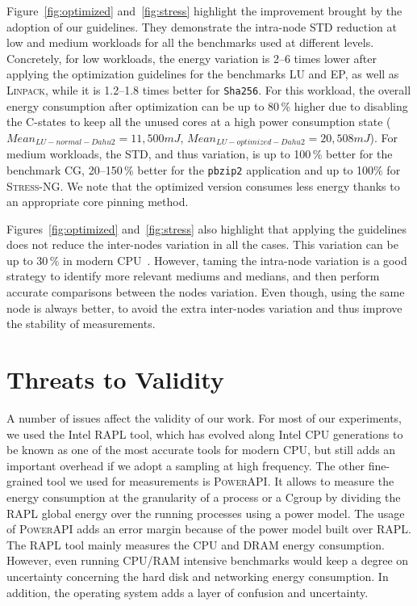 Figure~\ref{fig:optimized} and~\ref{fig:stress} highlight the improvement brought by the adoption of our guidelines.
They demonstrate the intra-node STD reduction at low and medium workloads for all the benchmarks used at different levels.
Concretely, for low workloads, the energy variation is 2--6 times lower after applying the optimization guidelines for the benchmarks \textsf{LU} and \textsf{EP}, as well as \textsc{Linpack}, while it is 1.2--1.8 times better for \texttt{Sha256}.
For this workload, the overall energy consumption after optimization can be up to 80\,\% higher due to disabling the C-states to keep all the unused cores at a high power consumption state ($Mean_{LU-normal-Dahu2}=11,500 mJ$, $Mean_{LU-optimized-Dahu2}=20,508 mJ$).
For medium workloads, the STD, and thus variation, is up to 100\,\% better for the benchmark \textsf{CG}, 20--150\,\% better for the \texttt{pbzip2} application and up to 100\% for \textsc{Stress-NG}.
We note that the optimized version consumes less energy thanks to an appropriate core pinning method.

Figures~\ref{fig:optimized} and~\ref{fig:stress} also highlight that applying the guidelines does not reduce the inter-nodes variation in all the cases.
This variation can be up to 30\,\% in modern CPU~\cite{wang_experimental_nodate}.
However, taming the intra-node variation is a good strategy to identify more relevant mediums and medians, and then perform accurate comparisons between the nodes variation.
Even though, using the same node is always better, to avoid the extra inter-nodes variation and thus improve the stability of measurements.

\section{Threats to Validity}\label{sec:threats}
A number of issues affect the validity of our work.
For most of our experiments, we used the Intel RAPL tool, which has evolved along Intel CPU generations to be known as one of the most accurate tools for modern CPU, but still adds an important overhead if we adopt a sampling at high frequency.
The other fine-grained tool we used for measurements is \textsc{PowerAPI}.
It allows to measure the energy consumption at the granularity of a process or a Cgroup by dividing the RAPL global energy over the running processes using a power model.
The usage of \textsc{PowerAPI} adds an error margin because of the power model built over RAPL.
The RAPL tool mainly measures the CPU and DRAM energy consumption.
However, even running CPU/RAM intensive benchmarks would keep a degree on uncertainty concerning the hard disk and networking energy consumption.
In addition, the operating system adds a layer of confusion and uncertainty.

